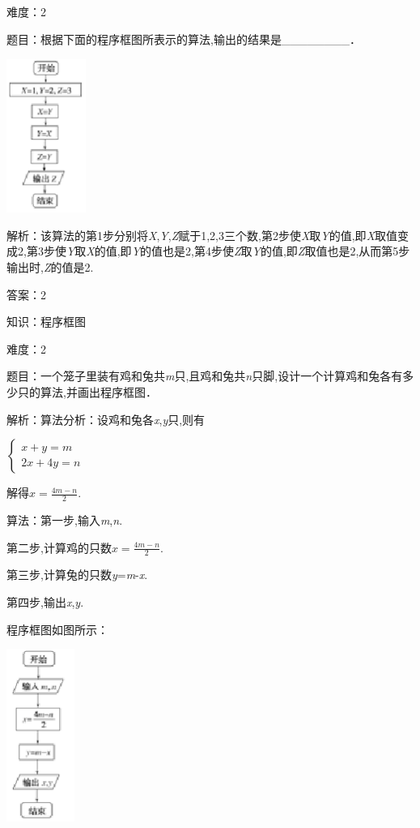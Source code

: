 \documentclass{article} %
\begin{document}
难度：2

题目：根据下面的程序框图所表示的算法,输出的结果是\_\_\_\_\_\_\_\_．

\includegraphics*[width=1.02in, height=1.98in, keepaspectratio=false]{image12}

解析：该算法的第1步分别将\textit{X},\textit{Y},\textit{Z}赋于1,2,3三个数,第2步使\textit{X}取\textit{Y}的值,即\textit{X}取值变成2,第3步使\textit{Y}取\textit{X}的值,即\textit{Y}的值也是2,第4步使\textit{Z}取\textit{Y}的值,即\textit{Z}取值也是2,从而第5步输出时,\textit{Z}的值是2.

答案：2

知识：程序框图

难度：2

题目：一个笼子里装有鸡和兔共\textit{m}只,且鸡和兔共\textit{n}只脚,设计一个计算鸡和兔各有多少只的算法,并画出程序框图．

解析：算法分析：设鸡和兔各\textit{x},\textit{y}只,则有

$\left\{\begin{array}{l}
x+y=m\\
2x+4y=n
\end{array}\right.$

解得$x=\frac{4m-n}{2}$.

算法：第一步,输入\textit{m},\textit{n}.

第二步,计算鸡的只数$x=\frac{4m-n}{2}$.

第三步,计算兔的只数\textit{y}=\textit{m}-\textit{x}.

第四步,输出\textit{x},\textit{y}.

程序框图如图所示：

\includegraphics*[width=0.88in, height=2.22in, keepaspectratio=false]{image13}
\end{document}
